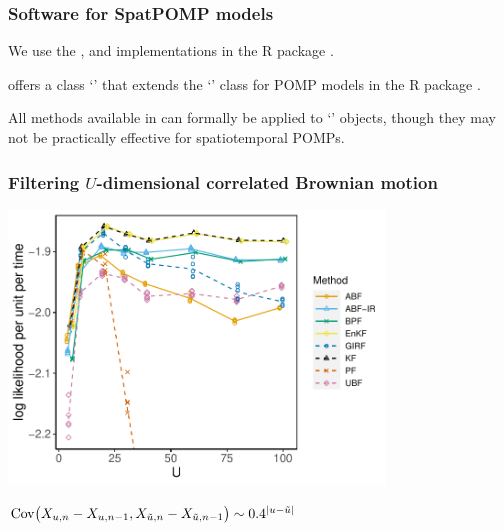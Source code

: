 \documentclass{beamer}
\begin{document}
\begin{frame}
  \frametitle{Software for SpatPOMP models}

  \begin{myitemize}
  \item We use the ,  and  implementations in the  R package  \citep{asfaw20github}.

\vspace{5mm}

  \item {} offers a class `' that extends the `' class for POMP models in the R package  \citep{king16}.


\vspace{5mm}

  \item All methods available in  can formally be applied to `' objects, though they may not be practically effective for spatiotemporal POMPs.
    \end{myitemize}
    
\end{frame}

\begin{frame}
\frametitle{Filtering $U$-dimensional correlated Brownian motion}

\vspace{-3mm}

\begin{center}
\includegraphics[width=10cm]{bm_alt_plot-1.pdf}

\vspace{-1mm}

$\mathrm{Cov}\big(X_{u,n}-X_{u,n-1},X_{\tilde u,n}-X_{\tilde u,n-1}\big) \sim 0.4^{|u-\tilde u|}_{}$

\end{center}

\end{frame}
\end{document}
